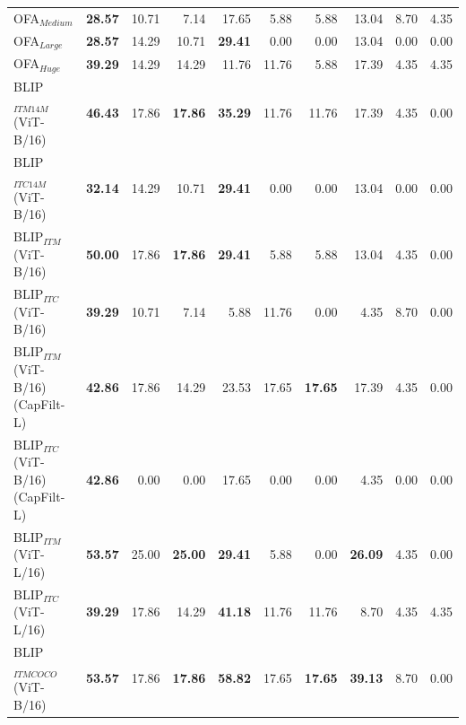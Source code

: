 \begin{table}[ht]
\begin{adjustbox}{max width=0.8\textwidth}
\begin{tabular}{l|rrr|rrr|rrr}
 OFA$_{Medium}$                      & \textbf{28.57} & 10.71          & 7.14           & 17.65          & 5.88           & 5.88           & 13.04          & 8.70           & 4.35           \\
 OFA$_{Large}$                       & \textbf{28.57} & 14.29          & 10.71          & \textbf{29.41} & 0.00           & 0.00           & 13.04          & 0.00           & 0.00           \\
 OFA$_{Huge}$                        & \textbf{39.29} & 14.29          & 14.29          & 11.76          & 11.76          & 5.88           & 17.39          & 4.35           & 4.35           \\
 BLIP$_{ITM 14M}$ (ViT-B/16)         & \textbf{46.43} & 17.86          & \textbf{17.86} & \textbf{35.29} & 11.76          & 11.76          & 17.39          & 4.35           & 0.00           \\
 BLIP$_{ITC 14M}$ (ViT-B/16)         & \textbf{32.14} & 14.29          & 10.71          & \textbf{29.41} & 0.00           & 0.00           & 13.04          & 0.00           & 0.00           \\
 BLIP$_{ITM}$ (ViT-B/16)             & \textbf{50.00} & 17.86          & \textbf{17.86} & \textbf{29.41} & 5.88           & 5.88           & 13.04          & 4.35           & 0.00           \\
 BLIP$_{ITC}$ (ViT-B/16)             & \textbf{39.29} & 10.71          & 7.14           & 5.88           & 11.76          & 0.00           & 4.35           & 8.70           & 0.00           \\
 BLIP$_{ITM}$ (ViT-B/16) (CapFilt-L) & \textbf{42.86} & 17.86          & 14.29          & 23.53          & 17.65          & \textbf{17.65} & 17.39          & 4.35           & 0.00           \\
 BLIP$_{ITC}$ (ViT-B/16) (CapFilt-L) & \textbf{42.86} & 0.00           & 0.00           & 17.65          & 0.00           & 0.00           & 4.35           & 0.00           & 0.00           \\
 BLIP$_{ITM}$ (ViT-L/16)             & \textbf{53.57} & 25.00          & \textbf{25.00} & \textbf{29.41} & 5.88           & 0.00           & \textbf{26.09} & 4.35           & 0.00           \\
 BLIP$_{ITC}$ (ViT-L/16)             & \textbf{39.29} & 17.86          & 14.29          & \textbf{41.18} & 11.76          & 11.76          & 8.70           & 4.35           & 4.35           \\
 BLIP$_{ITM COCO}$ (ViT-B/16)        & \textbf{53.57} & 17.86          & \textbf{17.86} & \textbf{58.82} & 17.65          & \textbf{17.65} & \textbf{39.13} & 8.70           & 0.00           \\

\end{tabular}
\end{adjustbox}
\end{table}
